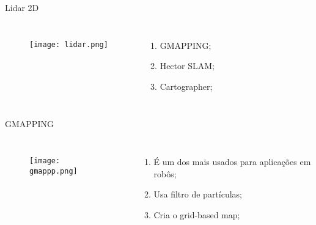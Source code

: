 \begin{frame}[t]{Lidar 2D}
    \transboxout[duration=0.5]
    \begin{columns}
            \begin{figure}
            \texttt{[image: lidar.png]}
            \caption{\cite{Sensores71}}
            \end{figure}
            \begin{enumerate}
                \item GMAPPING;
                \item Hector SLAM;
                \item Cartographer;     
            \end{enumerate}
    \end{columns}
\end{frame}
\begin{frame}[c]{GMAPPING}
    \transboxout[duration=0.5]
    \begin{columns}
            \begin{figure}
            \texttt{[image: gmappp.png]}
            \caption{\cite{Robotics19}}
            \end{figure}
            \begin{enumerate}
                \item É um dos mais usados para aplicações em robôs;
                \item Usa filtro de partículas;
                \item Cria o grid-based map;     
            \end{enumerate}
    \end{columns}

\end{frame}
